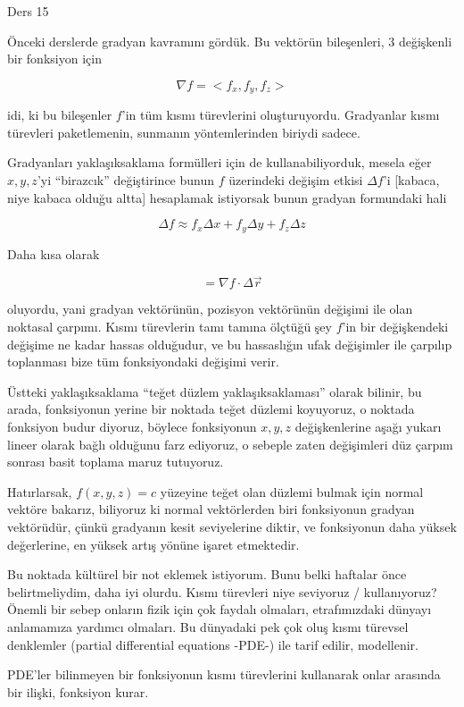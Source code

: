 \documentclass[12pt,fleqn]{article}\usepackage{../../common}
\begin{document}
Ders 15

Önceki derslerde gradyan kavramını gördük. Bu vektörün bileşenleri, 3
değişkenli bir fonksiyon için

$$ 
\nabla f = < f_x, f_y, f_z > 
$$

idi, ki bu bileşenler $f$'in tüm kısmı türevlerini
oluşturuyordu. Gradyanlar kısmı türevleri paketlemenin, sunmanın
yöntemlerinden biriydi sadece.

Gradyanları yaklaşıksaklama formülleri için de kullanabiliyorduk, mesela
eğer $x,y,z$'yi ``birazcık'' değiştirince bunun $f$ üzerindeki değişim
etkisi $\Delta f$'i [kabaca, niye kabaca olduğu altta] hesaplamak
istiyorsak bunun gradyan formundaki hali

$$ \Delta f \approx f_x \Delta x + f_y \Delta y + f_z \Delta z $$

Daha kısa olarak 

$$ = \nabla f \cdot \Delta \vec{r} $$

oluyordu, yani gradyan vektörünün, pozisyon vektörünün değişimi ile olan
noktasal çarpımı. Kısmı türevlerin tamı tamına ölçtüğü şey $f$'in bir
değişkendeki değişime ne kadar hassas olduğudur, ve bu hassaslığın ufak
değişimler ile çarpılıp toplanması bize tüm fonksiyondaki değişimi verir.

Üstteki yaklaşıksaklama ``teğet düzlem yaklaşıksaklaması'' olarak bilinir,
bu arada, fonksiyonun yerine bir noktada teğet düzlemi koyuyoruz, o noktada
fonksiyon budur diyoruz, böylece fonksiyonun $x,y,z$ değişkenlerine aşağı
yukarı lineer olarak bağlı olduğunu farz ediyoruz, o sebeple zaten
değişimleri düz çarpım sonrası basit toplama maruz tutuyoruz. 

Hatırlarsak, $f(x,y,z)=c$ yüzeyine teğet olan düzlemi bulmak için normal
vektöre bakarız, biliyoruz ki normal vektörlerden biri fonksiyonun gradyan
vektörüdür, çünkü gradyanın kesit seviyelerine diktir, ve fonksiyonun daha
yüksek değerlerine, en yüksek artış yönüne işaret etmektedir. 

Bu noktada kültürel bir not eklemek istiyorum. Bunu belki haftalar önce
belirtmeliydim, daha iyi olurdu. Kısmı türevleri niye seviyoruz /
kullanıyoruz? Önemli bir sebep onların fizik için çok faydalı olmaları,
etrafımızdaki dünyayı anlamamıza yardımcı olmaları. Bu dünyadaki pek çok
oluş kısmı türevsel denklemler (partial differential equations -PDE-) ile
tarif edilir, modellenir.

PDE'ler bilinmeyen bir fonksiyonun kısmı türevlerini kullanarak onlar
arasında bir ilişki, fonksiyon kurar. 
\end{document}

